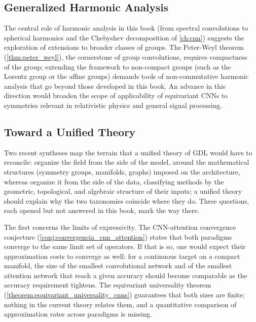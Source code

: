 \subsection{Generalized Harmonic Analysis}

The central role of harmonic analysis in this book (from spectral convolutions to spherical harmonics and the Chebyshev decomposition of \autoref{ch:cnn}) suggests the exploration of extensions to broader classes of groups. The Peter-Weyl theorem (\autoref{thm:peter_weyl}), the cornerstone of group convolutions, requires compactness of the group; extending the framework to non-compact groups (such as the Lorentz group or the affine groups) demands tools of non-commutative harmonic analysis that go beyond those developed in this book. An advance in this direction would broaden the scope of applicability of equivariant \glspl{CNN} to symmetries relevant in relativistic physics and general signal processing.


\subsection{Toward a Unified Theory}\label{subsec:hacia_teoria_unificada}

Two recent syntheses map the terrain that a unified theory of \gls{GDL} would have to reconcile: \citet{saezdeocarizborde2025mathfoundations} organize the field from the side of the model, around the mathematical structures (symmetry groups, manifolds, graphs) imposed on the architecture, whereas \citet{papillon2024beyondeuclid} organize it from the side of the data, classifying methods by the geometric, topological, and algebraic structure of their inputs; a unified theory should explain why the two taxonomies coincide where they do. Three questions, each opened but not answered in this book, mark the way there.

The first concerns the limits of expressivity. The \gls{CNN}-attention convergence conjecture (\autoref{conj:convergencia_cnn_attention}) states that both paradigms converge to the same limit set of operators. If that is so, one would expect their approximation costs to converge as well: for a continuous target on a compact manifold, the size of the smallest convolutional network and of the smallest attention network that reach a given accuracy should become comparable as the accuracy requirement tightens. The equivariant universality theorem (\autoref{theorem:equivariant_universality_cnns}) guarantees that both sizes are finite; nothing in the current theory relates them, and a quantitative comparison of approximation rates across paradigms is missing.

